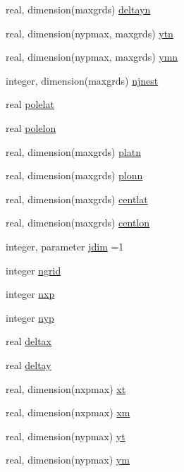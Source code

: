\begin{DoxyCompactItemize}
\item 
real, dimension(maxgrds) \hyperlink{namespacegrid__coms_a9223404a2c92ad4c68494e9200f2d604}{deltayn}
\item 
real, dimension(nypmax, maxgrds) \hyperlink{namespacegrid__coms_aa853f8064bf96a5159ba89902bf37efb}{ytn}
\item 
real, dimension(nypmax, maxgrds) \hyperlink{namespacegrid__coms_ac86adbc4cb710451d5b9ae53178a756b}{ymn}
\item 
integer, dimension(maxgrds) \hyperlink{namespacegrid__coms_a98e39448e926de9a2fa2de1ad700e7ae}{njnest}
\item 
real \hyperlink{namespacegrid__coms_a332ff2495f60062e9fa9f90035dc8cd3}{polelat}
\item 
real \hyperlink{namespacegrid__coms_ad1ae0e93c1ba39b88b6e957547176e8a}{polelon}
\item 
real, dimension(maxgrds) \hyperlink{namespacegrid__coms_adeea6f966fb6ad97de70d6d4f27e273c}{platn}
\item 
real, dimension(maxgrds) \hyperlink{namespacegrid__coms_aeb6e6ef8eced0c1e67af7b80cead352c}{plonn}
\item 
real, dimension(maxgrds) \hyperlink{namespacegrid__coms_a88baeaebc7ead79b3b400cfa34392384}{centlat}
\item 
real, dimension(maxgrds) \hyperlink{namespacegrid__coms_a249d1ce34222c741969c77af125d21ba}{centlon}
\item 
integer, parameter \hyperlink{namespacegrid__coms_ae52c617003c61ec2de61c4615fd9c707}{jdim} =1
\item 
integer \hyperlink{namespacegrid__coms_a40741410645b943eedf06a7c11a6197d}{ngrid}
\item 
integer \hyperlink{namespacegrid__coms_aff2c702052cc543c317c4feea0dbb76a}{nxp}
\item 
integer \hyperlink{namespacegrid__coms_af5bde1fabbca5ebe3e44f565781fc950}{nyp}
\item 
real \hyperlink{namespacegrid__coms_aefac306f17fd9da10ae08206490c1d96}{deltax}
\item 
real \hyperlink{namespacegrid__coms_a80d44caaab6b380ba782f2e41e9c00a8}{deltay}
\item 
real, dimension(nxpmax) \hyperlink{namespacegrid__coms_ab408e5eee5cb44c67ad1321c400c71ec}{xt}
\item 
real, dimension(nxpmax) \hyperlink{namespacegrid__coms_afa5dc0abd71433f8c1e1e42ed0f3f485}{xm}
\item 
real, dimension(nypmax) \hyperlink{namespacegrid__coms_a24ff2ae7949aa76dc0d798ef5baa5aab}{yt}
\item 
real, dimension(nypmax) \hyperlink{namespacegrid__coms_a4e0c01da9f5b650af168d526fc6161e6}{ym}
\end{DoxyCompactItemize}


